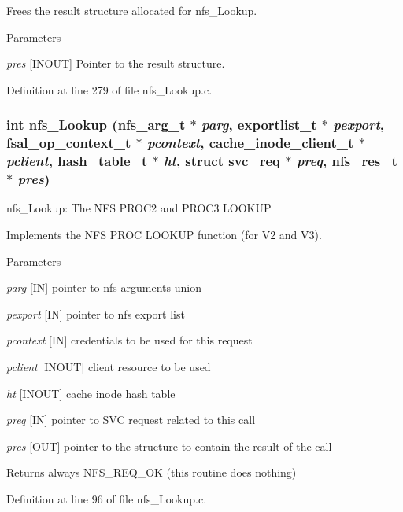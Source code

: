 Frees the result structure allocated for nfs\_\-Lookup.


\begin{DoxyParams}{Parameters}
\item[{\em pres}][INOUT] Pointer to the result structure. \end{DoxyParams}


Definition at line 279 of file nfs\_\-Lookup.c.
\subsubsection[{nfs\_\-Lookup}]{\setlength{\rightskip}{0pt plus 5cm}int nfs\_\-Lookup (nfs\_\-arg\_\-t $\ast$ {\em parg}, \/  exportlist\_\-t $\ast$ {\em pexport}, \/  fsal\_\-op\_\-context\_\-t $\ast$ {\em pcontext}, \/  cache\_\-inode\_\-client\_\-t $\ast$ {\em pclient}, \/  hash\_\-table\_\-t $\ast$ {\em ht}, \/  struct svc\_\-req $\ast$ {\em preq}, \/  nfs\_\-res\_\-t $\ast$ {\em pres})}\label{nfs__Lookup_8c_a9b9787324c806ff072b3da95293efd01}
nfs\_\-Lookup: The NFS PROC2 and PROC3 LOOKUP

Implements the NFS PROC LOOKUP function (for V2 and V3).


\begin{DoxyParams}{Parameters}
\item[{\em parg}][IN] pointer to nfs arguments union \item[{\em pexport}][IN] pointer to nfs export list \item[{\em pcontext}][IN] credentials to be used for this request \item[{\em pclient}][INOUT] client resource to be used \item[{\em ht}][INOUT] cache inode hash table \item[{\em preq}][IN] pointer to SVC request related to this call \item[{\em pres}][OUT] pointer to the structure to contain the result of the call\end{DoxyParams}
\begin{DoxyReturn}{Returns}
always NFS\_\-REQ\_\-OK (this routine does nothing) 
\end{DoxyReturn}


Definition at line 96 of file nfs\_\-Lookup.c.